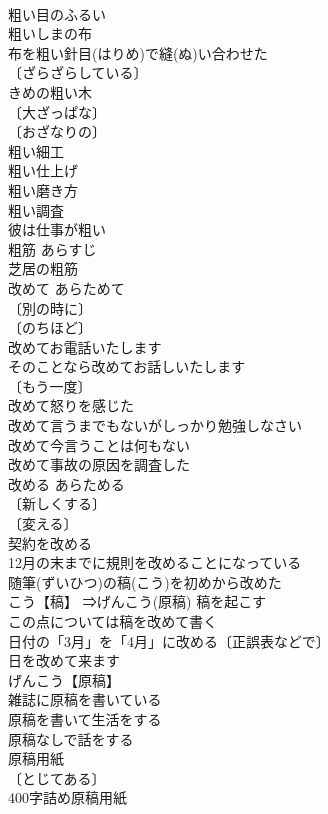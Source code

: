 \documentclass[8pt]{extreport}
\begin{document}
\begin{CJK}{UTF8}{min}
\\	粗い目のふるい 
\\	粗いしまの布 
\\	布を粗い針目(はりめ)で縫(ぬ)い合わせた 
\\	〔ざらざらしている〕
\\	きめの粗い木 
\\	〔大ざっぱな〕
\\	〔おざなりの〕
\\	粗い細工 
\\	粗い仕上げ 
\\	粗い磨き方 
\\	粗い調査 
\\	彼は仕事が粗い 
\\	粗筋	あらすじ	
\\	芝居の粗筋 
\\	改めて	あらためて	
\\	〔別の時に〕
\\	〔のちほど〕
\\	改めてお電話いたします 
\\	そのことなら改めてお話しいたします 
\\	〔もう一度〕
\\	改めて怒りを感じた 
\\	改めて言うまでもないがしっかり勉強しなさい 
\\	改めて今言うことは何もない 
\\	改めて事故の原因を調査した 
\\	改める	あらためる	
\\	〔新しくする〕
\\	〔変える〕
\\	契約を改める 
\\	12月の末までに規則を改めることになっている 
\\	随筆(ずいひつ)の稿(こう)を初めから改めた 
\\	こう【稿】 ⇒げんこう(原稿) 稿を起こす 
\\	この点については稿を改めて書く 
\\	日付の「3月」を「4月」に改める〔正誤表などで〕 
\\	日を改めて来ます 
\\	げんこう【原稿】
\\	雑誌に原稿を書いている 
\\	原稿を書いて生活をする 
\\	原稿なしで話をする 
\\	原稿用紙 
\\	〔とじてある〕
\\	400字詰め原稿用紙 

\end{CJK}
\end{document}
